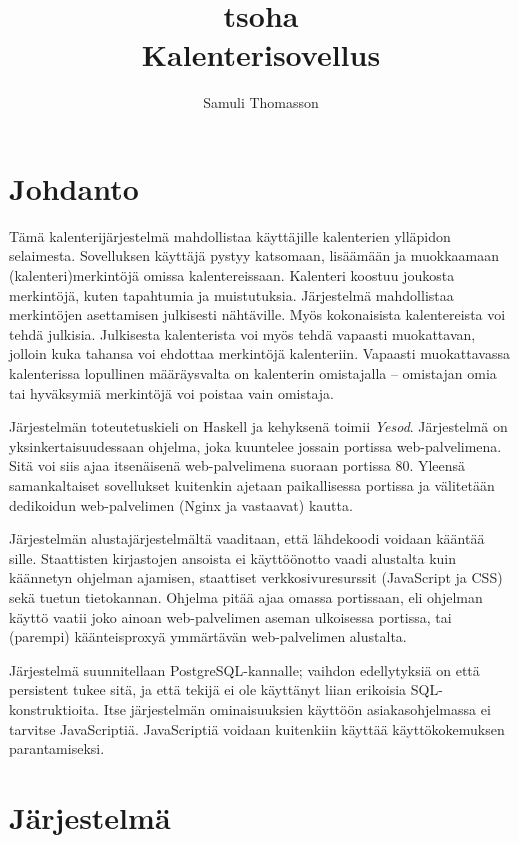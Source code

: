 \documentclass[a4paper,12pt]{report}
\title{tsoha\\Kalenterisovellus}
\author{Samuli Thomasson}
\begin{document}

\maketitle
\tableofcontents
\chapter{Johdanto}
Tämä kalenterijärjestelmä mahdollistaa käyttäjille kalenterien yllä\-pidon
selaimesta.  Sovelluksen käyttäjä pystyy katsomaan, lisäämään
ja muokkaamaan (kalenteri)merkintöjä omissa kalentereissaan.  Kalenteri koostuu
joukosta merkintöjä, kuten tapahtumia ja muistutuksia.  Järjestelmä mahdollistaa
merkintöjen asettamisen julkisesti nähtäville. Myös kokonaisista kalentereista
voi tehdä julkisia. Julkisesta kalenterista voi myös tehdä vapaasti muokattavan,
jolloin kuka tahansa voi ehdottaa merkintöjä kalenteriin. Vapaasti muokattavassa
kalenterissa lopullinen määräysvalta on kalenterin omistajalla -- omistajan omia
tai hyväksymiä merkintöjä voi poistaa vain omistaja.

Järjestelmän toteutetuskieli on Haskell ja kehyksenä toimii \emph{Yesod}.
Järjestelmä on yksinkertaisuudessaan ohjelma, joka kuuntelee jossain portissa
web-palvelimena. Sitä voi siis ajaa itsenäisenä web-palvelimena suoraan portissa
80. Yleensä samankaltaiset sovellukset kuitenkin ajetaan paikallisessa portissa
ja välitetään dedikoidun web-palvelimen (Nginx ja vastaavat) kautta.

Järjestelmän alustajärjestelmältä vaaditaan, että lähdekoodi voidaan kääntää
sille. Staattisten kirjastojen ansoista ei käyttöönotto vaadi alustalta kuin
käännetyn ohjelman ajamisen, staattiset verkkosivuresurssit (JavaScript ja CSS)
sekä tuetun tietokannan. Ohjelma pitää ajaa omassa portissaan, eli ohjelman
käyttö vaatii joko ainoan web-palvelimen aseman ulkoisessa portissa, tai
(parempi) käänteisproxyä ymmärtävän web-palvelimen alustalta.

Järjestelmä suunnitellaan PostgreSQL-kannalle; vaihdon edellytyksiä on että
persistent tukee sitä, ja että tekijä ei ole käyttänyt liian erikoisia
SQL-konstruktioita.  Itse järjestelmän ominaisuuksien käyttöön asiakasohjelmassa
ei tarvitse JavaScriptiä. JavaScriptiä voidaan kuitenkiin käyttää
käyttökokemuksen parantamiseksi.

\chapter{Järjestelmä}
\end{document}

